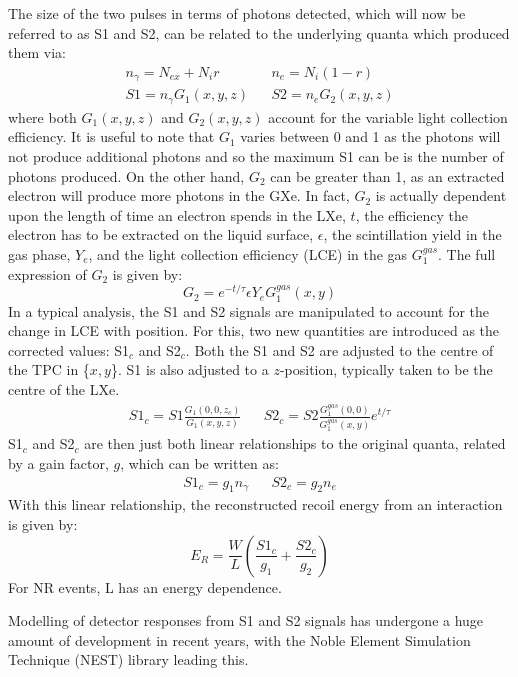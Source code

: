 \par
The size of the two pulses in terms of photons detected, which will now be referred to as S1 and S2, can be related to the underlying quanta which produced them via:
\begin{align}
    n_\gamma = N_{ex} + N_i r && n_e = N_i (1-r) \\
    S1 = n_\gamma G_1(x,y,z) && S2 = n_e G_2(x,y,z)
\end{align}
where both $G_1(x,y,z)$ and $G_2(x,y,z)$ account for the variable light collection efficiency.
It is useful to note that $G_1$ varies between 0 and 1 as the photons will not produce additional photons and so the maximum S1 can be is the number of photons produced.
On the other hand, $G_2$ can be greater than 1, as an extracted electron will produce more photons in the GXe.
In fact, $G_2$ is actually dependent upon the length of time an electron spends in the LXe, $t$, the efficiency the electron has to be extracted on the liquid surface, $\epsilon$, the scintillation yield in the gas phase, $Y_e$, and the light collection efficiency (LCE) in the gas $G_1^{gas}$.
The full expression of $G_2$ is given by:
\begin{equation}
    G_2 = e^{-t/\tau} \epsilon Y_e G_1^{gas}(x,y)
\end{equation}
In a typical analysis, the S1 and S2 signals are manipulated to account for the change in LCE with position.
For this, two new quantities are introduced as the corrected values: S1$_c$ and S2$_c$.
Both the S1 and S2 are adjusted to the centre of the TPC in \{$x,y$\}.
S1 is also adjusted to a $z$-position, typically taken to be the centre of the LXe.
\begin{align}
    S1_c = S1 \frac{G_1(0,0,z_c)}{G_1(x,y,z)} && S2_c = S2 \frac{G_1^{gas}(0,0)}{G_1^{gas}(x,y)} e^{t/\tau}
    \label{eq:s1c_and_s2c_full}
\end{align}
S1$_c$ and S2$_c$ are then just both linear relationships to the original quanta, related by a gain factor, $g$, which can be written as:
\begin{align}
    S1_c = g_1 n_\gamma && S2_c = g_2 n_e
\end{align}
With this linear relationship, the reconstructed recoil energy from an interaction is given by:
\begin{equation}
    E_R = \frac{W}{L}(\frac{S1_c}{g_1} + \frac{S2_c}{g_2})
\end{equation}
For NR events, L has an energy dependence.
\par
Modelling of detector responses from S1 and S2 signals has undergone a huge amount of development in recent years, with the Noble Element Simulation Technique (NEST) library leading this.
